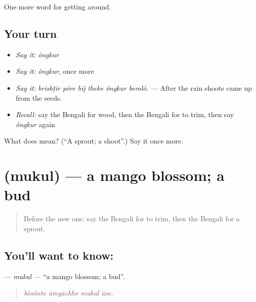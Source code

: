 \begin{grammarlens}[title={What you've built}]
One more word for getting around.
\end{grammarlens}

\subsection*{Your turn}
\begin{itemize}
\raggedright
  \item \emph{Say it:} \emph{ôngkur}
  \item \emph{Say it:} \emph{ôngkur}, once more
  \item \emph{Say it:} \emph{brishṭir pôre bīj theke ôngkur berolô.} — After the rain shoots came up from the seeds.
  \item \emph{Recall:} say the Bengali for wood, then the Bengali for to trim, then say \emph{ôngkur} again
\end{itemize}

\begin{tcolorbox}[breakable,colback=teal!4,colframe=teal!35!black,title={Before you move on}]
What does  mean? (\textquotedblleft{}A sprout; a shoot\textquotedblright{}.) Say it once more.
\end{tcolorbox}
\section[\texorpdfstring{\bn{মুকুল} (mukul)}{মুকুল (mukul)}]{ (mukul) — a mango blossom; a bud}

\label{lesson:BN-C436-mukul}



\begin{quote}
Before the new one: say the Bengali for to trim, then the Bengali for a sprout.
\end{quote}

\subsection*{You'll want to know: }
\textbf{} — \emph{mukul} — \textquotedblleft{}a mango blossom; a bud\textquotedblright{}.

\begin{quote}
   
\end{quote}

\begin{quote}
\emph{bôsônte āmgāchhe mukul āse.}
\end{quote}

